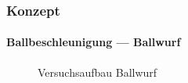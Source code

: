 \begin{frame}
    \frametitle{Konzept}
    \framesubtitle{Ballbeschleunigung --- Ballwurf}
    \begin{figure}[h!]
        \centering
        \caption{Versuchsaufbau Ballwurf}
    \end{figure}
\end{frame}

